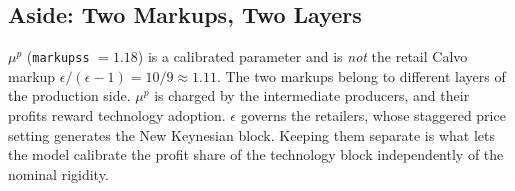 \documentclass[11pt]{article}
\begin{document}
\subsection{Aside: Two Markups, Two Layers}

$\mu^{p}$ (\texttt{markupss} $=1.18$) is a calibrated parameter and is \emph{not}
the retail Calvo markup $\epsilon/(\epsilon-1) = 10/9 \approx 1.11$. The two
markups belong to different layers of the production side. $\mu^{p}$ is charged by
the intermediate producers, and their profits reward technology adoption.
$\epsilon$ governs the retailers, whose staggered price setting generates the New
Keynesian block. Keeping them separate is what lets the model calibrate the profit
share of the technology block independently of the nominal rigidity.
\end{document}
